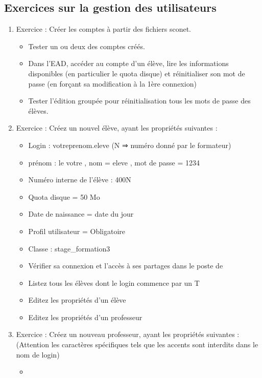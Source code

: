 \documentclass{article}
\begin{document}
\subsection{Exercices sur la gestion des utilisateurs}

\begin{enumerate}[(1)]
\item
  Exercice : Créer les comptes à partir des fichiers sconet.

  \begin{itemize}
  \item
    Tester un ou deux des comptes créés.
  \item
    Dans l'EAD, accéder au compte d'un élève, lire les informations
    disponibles (en particulier le quota disque) et réinitialiser son
    mot de passe (en forçant sa modification à la 1ère connexion)
  \item
    Tester l'édition groupée pour réinitialisation tous les mots de
    passe des élèves.
  \end{itemize}
\item
  Exercice : Créez un nouvel élève, ayant les propriétés suivantes :
  \begin{itemize}
  \item
    Login : votreprenom.eleve (N ⇒ numéro donné par le formateur)
  \item
    prénom : le votre , nom = eleve , mot de passe = 1234
  \item
    Numéro interne de l'élève : 400N
  \item
    Quota disque = 50 Mo
  \item
    Date de naissance = date du jour
  \item
    Profil utilisateur = Obligatoire
  \item
    Classe : stage\_formation3
  \item
    Vérifier sa connexion et l'accès à ses partages dans le poste de
  \item
    Listez tous les élèves dont le login commence par un T
  \item
    Editez les propriétés d'un élève
  \item
    Editez les propriétés d'un professeur
  \end{itemize}
\item
  Exercice : Créez un nouveau professeur, ayant les propriétés suivantes
  : (Attention les caractères spécifiques tels que les accents sont
  interdits dans le nom de login)
  \begin{itemize}
  \item

\end{itemize}
\end{enumerate}
\end{document}
